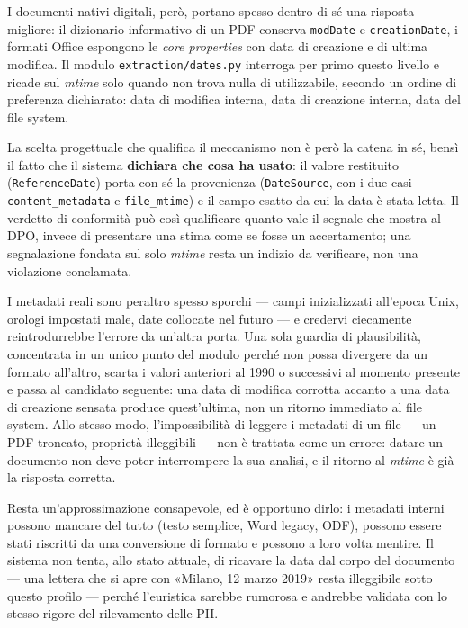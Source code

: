 I documenti nativi digitali, però, portano spesso dentro di sé una risposta migliore: il dizionario informativo di un PDF conserva \texttt{modDate} e \texttt{creationDate}, i formati Office espongono le \emph{core properties} con data di creazione e di ultima modifica. Il modulo \texttt{extraction/dates.py} interroga per primo questo livello e ricade sul \emph{mtime} solo quando non trova nulla di utilizzabile, secondo un ordine di preferenza dichiarato: data di modifica interna, data di creazione interna, data del file system. \medskip

La scelta progettuale che qualifica il meccanismo non è però la catena in sé, bensì il fatto che il sistema \textbf{dichiara che cosa ha usato}: il valore restituito (\texttt{ReferenceDate}) porta con sé la provenienza (\texttt{DateSource}, con i due casi \texttt{content\_metadata} e \texttt{file\_mtime}) e il campo esatto da cui la data è stata letta. Il verdetto di conformità può così qualificare quanto vale il segnale che mostra al DPO, invece di presentare una stima come se fosse un accertamento; una segnalazione fondata sul solo \emph{mtime} resta un indizio da verificare, non una violazione conclamata. \medskip

I metadati reali sono peraltro spesso sporchi --- campi inizializzati all'epoca Unix, orologi impostati male, date collocate nel futuro --- e credervi ciecamente reintrodurrebbe l'errore da un'altra porta. Una sola guardia di plausibilità, concentrata in un unico punto del modulo perché non possa divergere da un formato all'altro, scarta i valori anteriori al 1990 o successivi al momento presente e passa al candidato seguente: una data di modifica corrotta accanto a una data di creazione sensata produce quest'ultima, non un ritorno immediato al file system. Allo stesso modo, l'impossibilità di leggere i metadati di un file --- un PDF troncato, proprietà illeggibili --- non è trattata come un errore: datare un documento non deve poter interrompere la sua analisi, e il ritorno al \emph{mtime} è già la risposta corretta. \medskip

Resta un'approssimazione consapevole, ed è opportuno dirlo: i metadati interni possono mancare del tutto (testo semplice, Word legacy, ODF), possono essere stati riscritti da una conversione di formato e possono a loro volta mentire. Il sistema non tenta, allo stato attuale, di ricavare la data dal corpo del documento --- una lettera che si apre con «Milano, 12 marzo 2019» resta illeggibile sotto questo profilo --- perché l'euristica sarebbe rumorosa e andrebbe validata con lo stesso rigore del rilevamento delle PII.

